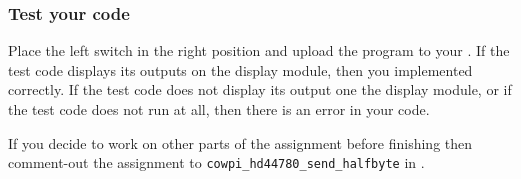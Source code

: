 \subsubsection*{Test your code}

Place the left switch in the right position and upload the program to your \developmentboard.
If the test code displays its outputs on the display module, then you implemented  correctly.
If the test code does not display its output one the display module, or if the test code does not run at all, then there is an error in your code.

\vspace{1cm}

If you decide to work on other parts of the assignment before finishing  then comment-out the assignment to \lstinline{cowpi_hd44780_send_halfbyte} in .
